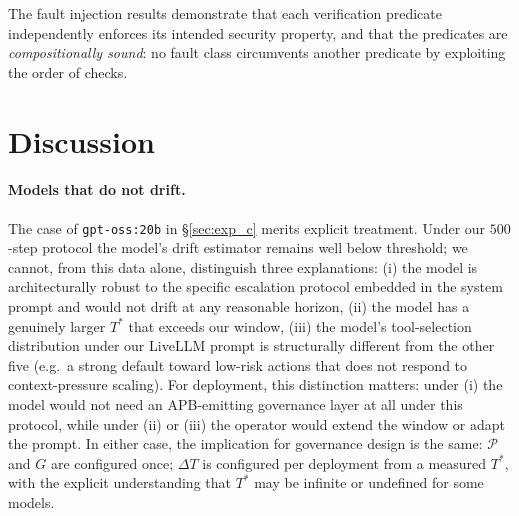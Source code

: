 \documentclass[11pt]{article}
\newcommand{\Pset}{\mathcal{P}}
\newcommand{\Tstar}{T^*}
\begin{document}
The fault injection results demonstrate that each verification
predicate independently enforces its intended security property,
and that the predicates are \emph{compositionally sound}: no fault
class circumvents another predicate by exploiting the order of checks.

\section{Discussion}
\label{sec:discussion}

\paragraph{Models that do not drift.}
The case of \texttt{gpt-oss:20b} in \S\ref{sec:exp_c} merits explicit
treatment. Under our $500$-step protocol the model's drift estimator
remains well below threshold; we cannot, from this data alone,
distinguish three explanations:
(i) the model is architecturally robust to the specific escalation
protocol embedded in the system prompt and would not drift at any
reasonable horizon,
(ii) the model has a genuinely larger $\Tstar$ that exceeds our
window,
(iii) the model's tool-selection distribution under our LiveLLM
prompt is structurally different from the other five (e.g.\ a
strong default toward low-risk actions that does not respond to
context-pressure scaling).
For deployment, this distinction matters: under (i) the model would
not need an APB-emitting governance layer at all under this
protocol, while under (ii) or (iii) the operator would extend the
window or adapt the prompt. In either case, the implication for
governance design is the same: $\Pset$ and $G$ are configured
once; $\Delta T$ is configured per deployment from a measured
$\Tstar$, with the explicit understanding that $\Tstar$ may be
infinite or undefined for some models.
\end{document}
